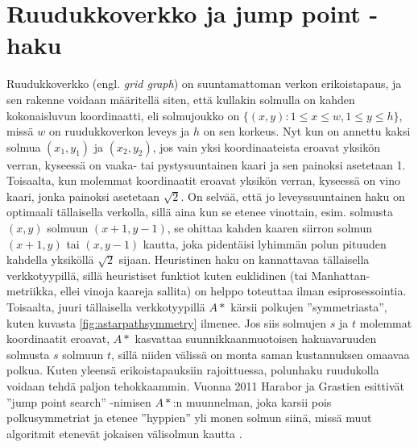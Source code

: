 \documentclass[finnish]{tktltiki2}
\theoremstyle{definition}
\theoremstyle{remark}
\begin{document}
\section{Ruudukkoverkko ja jump point -haku}
Ruudukkoverkko (engl. \textit{grid graph}) on suuntamattoman verkon erikoistapaus, ja sen rakenne voidaan määritellä siten, että kullakin solmulla on kahden kokonaisluvun koordinaatti, eli solmujoukko on $\{ (x, y) \colon 1 \leq x \leq w, 1 \leq y \leq h \}$, missä $w$ on ruudukkoverkon leveys ja $h$ on sen korkeus. Nyt kun on annettu kaksi solmua $(x_1, y_1)$ ja $(x_2, y_2)$, jos vain yksi koordinaateista eroavat yksikön verran, kyseessä on vaaka- tai pystysuuntainen kaari ja sen painoksi asetetaan 1. Toisaalta, kun molemmat koordinaatit eroavat yksikön verran, kyseessä on vino kaari, jonka painoksi asetetaan $\sqrt{2}$. On selvää, että jo leveyssuuntainen haku on optimaali tällaisella verkolla, sillä aina kun se etenee vinottain, esim. solmusta $(x, y)$ solmuun $(x + 1, y - 1)$, se ohittaa kahden kaaren siirron solmun $(x + 1, y)$ tai $(x, y - 1)$ kautta, joka pidentäisi lyhimmän polun pituuden kahdella yksiköllä $\sqrt{2}$ sijaan. Heuristinen haku on kannattavaa tällaisella verkkotyypillä, sillä heuristiset funktiot kuten euklidinen (tai Manhattan-metriikka, ellei vinoja kaareja sallita) on helppo toteuttaa ilman esiprosessointia. Toisaalta, juuri tällaisella verkkotyypillä $A\ast$ kärsii polkujen ''symmetriasta'', kuten kuvasta \ref{fig:astarpathsymmetry} ilmenee. Jos siis solmujen $s$ ja $t$ molemmat koordinaatit eroavat, $A\ast$ kasvattaa suunnikkaanmuotoisen hakuavaruuden solmusta $s$ solmuun $t$, sillä niiden välissä on monta saman kustannuksen omaavaa polkua. Kuten yleensä erikoistapauksiin rajoittuessa, polunhaku ruudukolla voidaan tehdä paljon tehokkaammin. Vuonna 2011 Harabor ja Grastien esittivät ''jump point search'' -nimisen $A\ast$:n muunnelman, joka karsii pois polkusymmetriat ja etenee ''hyppien'' yli monen solmun siinä, missä muut algoritmit etenevät jokaisen välisolmun kautta \cite{Harabor11}.
\end{document}
